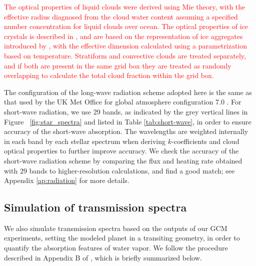 \documentclass[11pt,numberedappendix,twocolappendix,]{emulateapj}
\def\wv{water vapor}
\def\addYF#1{\textcolor{red}{#1}}
\begin{document}
\addYF{The optical properties of liquid clouds were derived using Mie theory, with the effective radius diagnosed from the cloud water content assuming a specified number concentration for liquid clouds over ocean. 
The optical properties of ice crystals is described in \citet{Edwards2007}, and are based on the representation of ice aggregates introduced by \citet{Baran2001}, with the effective dimension calculated using a parametrization based on temperature.
Stratiform and convective clouds are treated separately, and if both are present in the same grid box they are treated as randomly overlapping to calculate the total cloud fraction within the grid box. }

The configuration of the long-wave radiation scheme adopted here is the same as that used by the UK Met Office for global atmosphere configuration 7.0 \citep[GA7.0;][]{Walters2017}. 
For short-wave radiation, we use 29 bands, as indicated by the grey vertical lines in Figure ~\ref{fig:star_spectra} and listed in Table \ref{tab:short-wave}, in order to ensure accuracy of the short-wave absorption. 
The wavelengths are weighted internally in each band by each stellar spectrum when deriving $k$-coefficients and cloud optical properties to further improve accuracy. 
We check the accuracy of the short-wave radiation scheme by comparing the flux and heating rate obtained with $29$ bands to higher-resolution calculations, and find a good match; see Appendix \ref{ap:radiation} for more details. 




\subsection{Simulation of transmission spectra}
\label{ss:method_TransmissionSpectra}

We also simulate transmission spectra based on the outputs of our GCM experiments, setting the modeled planet in a transiting geometry, in order to quantify the absorption features of \wv{}.  
We follow the procedure described in Appendix B of \citet{Way2017}, which is briefly summarized below. 
\end{document}
